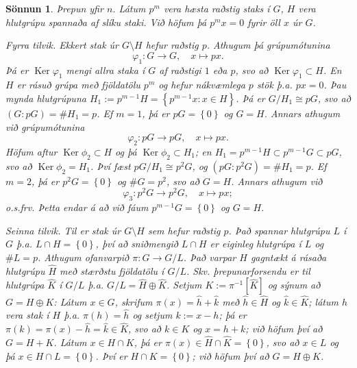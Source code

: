 \documentclass[a4paper,icelandic,11pt]{book}
\theoremstyle{plain}
\newtheorem*{sonnun}{Sönnun}
\DeclareMathOperator{\Ker}{Ker} %
\begin{document}
\begin{sonnun}
  Þrepun yfir $n$. Látum $p^{m}$ vera hæsta raðstig staks í $G$, $H$ vera
  hlutgrúpu spannaða af slíku staki. Við höfum þá $p^{m}x=0$ fyrir öll $x$ úr
  $G$.

  \emph{Fyrra tilvik}. Ekkert stak úr $G\setminus H$ hefur raðstig $p$. Athugum
  þá grúpumótunina 
  \begin{equation*}
  \varphi_1:G\to G,\quad x\mapsto px.
  \end{equation*}
  Þá er $\Ker\varphi_1$ mengi allra staka í $G$ af raðstigi $1$ eða $p$, svo að
  $\Ker\varphi_1 \subset H$. En $H$ er rásuð grúpa með fjöldatölu $p^m$ og hefur
  nákvæmlega $p$ stök þ.a. $px = 0$. Þau mynda hlutgrúpuna $H_1 := 
  p^{m-1}H = \left\{ p^{m-1}x:x\in H \right\}$. Þá er $G/H_1\cong pG$, svo að 
  $\left( G:pG \right) = \#H_1 = p$. Ef $m = 1$, þá er $pG = \left\{ 0 \right\}$
  og $G = H$. Annars athugum við grúpumótunina 
  \begin{equation*}
  \varphi_2 : pG \to pG,\quad x\mapsto px.
  \end{equation*}
  Höfum aftur $\Ker\phi_2 \subset H$ og þá $\Ker\phi_2 \subset H_1$; en
  $H_1 = p^{m-1} H\subset p^{m-1} G \subset pG$, svo að $\Ker\phi_2 = H_1$. Því
  fæst $pG/H_1 \cong p^{2} G$, og $\left( pG:p^{2}G \right) = \#H_1 = p$. Ef
  $m = 2$, þá er $p^2 G = \left\{ 0 \right\}$ og $\#G = p^2$, svo að $G = H$. 
  Annars athugum við
  \begin{equation*}
  \varphi_3: p^{2}G\to p^2 G, \quad x\mapsto px;
  \end{equation*}
  o.s.frv. Þetta endar á að við fáum $p^{m-1}G = \left\{ 0 \right\}$ og
  $G = H$.

  \emph{Seinna tilvik}. Til er stak úr $G\setminus H$ sem hefur raðstig
  $p$. Það spannar hlutgrúpu $L$ í $G$ þ.a. $L\cap H = \left\{ 0 \right\}$, því
  að sniðmengið $L\cap H$ er eiginleg hlutgrúpa í $L$ og $\#L = p$. Athugum
  ofanvarpið $\pi:G\to G/L$. Það varpar $H$ gagntækt á rásaða hlutgrúpu
  $\hat{H}$ með stærðstu fjöldatölu í $G/L$. Skv. þrepunarforsendu er til
  hlutgrúpa $\hat{K}$ í $G/L$ þ.a. $G/L = \hat{H}\oplus\hat{K}$. Setjum
  $K := \pi^{-1}[ \hat K ]$ og sýnum að $G = H\oplus K$: Látum
  $x\in G$, skrifum $\pi(x) = \hat h + \hat k$ með $\hat h \in \hat H$ og
  $\hat k \in \hat K$; látum $h$ vera stak í $H$ þ.a. $\pi(h) = \hat h$ og
  setjum $k := x-h$; þá er $\pi(k) = \pi(x) - \hat h = \hat k \in \hat K$, svo
  að $k\in K$ og $x = h+k$; við höfum því að $G = H + K$. Látum $x\in H\cap K$,
  þá er $\pi(x)\in \hat H \cap \hat K = \left\{ 0 \right\}$, svo að $x\in L$ og
  þá $x\in H\cap L = \left\{ 0 \right\}$. Því er $H\cap K = \left\{ 0 \right\}$;
  við höfum því að $G = H\oplus K$.
\end{sonnun}
\end{document}
